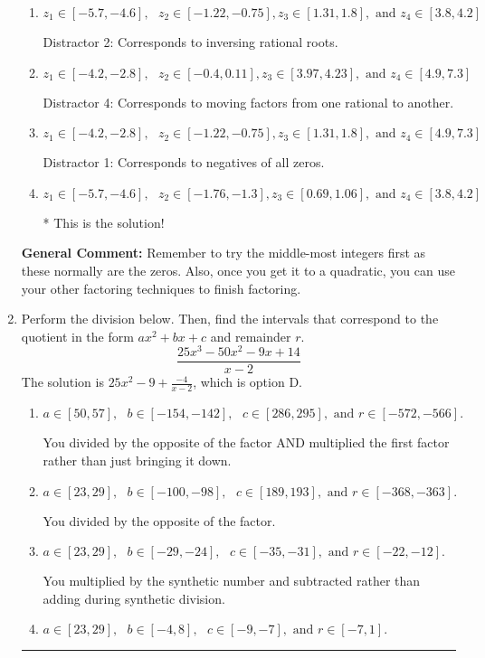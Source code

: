 \documentclass{extbook}[14pt]
\newcommand{\litem}[1]{\item #1

\rule{\textwidth}{0.4pt}}
\begin{document}
\begin{enumerate}
{\begin{enumerate}[label=\Alph*.]
 Distractor 3: Corresponds to negatives of all zeros AND inversing rational roots.
\item \( z_1 \in [-5.7, -4.6], \text{   }  z_2 \in [-1.22, -0.75], z_3 \in [1.31, 1.8], \text{   and   } z_4 \in [3.8, 4.2] \)

 Distractor 2: Corresponds to inversing rational roots.
\item \( z_1 \in [-4.2, -2.8], \text{   }  z_2 \in [-0.4, 0.11], z_3 \in [3.97, 4.23], \text{   and   } z_4 \in [4.9, 7.3] \)

 Distractor 4: Corresponds to moving factors from one rational to another.
\item \( z_1 \in [-4.2, -2.8], \text{   }  z_2 \in [-1.22, -0.75], z_3 \in [1.31, 1.8], \text{   and   } z_4 \in [4.9, 7.3] \)

 Distractor 1: Corresponds to negatives of all zeros.
\item \( z_1 \in [-5.7, -4.6], \text{   }  z_2 \in [-1.76, -1.3], z_3 \in [0.69, 1.06], \text{   and   } z_4 \in [3.8, 4.2] \)

* This is the solution!
\end{enumerate}

\textbf{General Comment:} Remember to try the middle-most integers first as these normally are the zeros. Also, once you get it to a quadratic, you can use your other factoring techniques to finish factoring.
}
\litem{
Perform the division below. Then, find the intervals that correspond to the quotient in the form $ax^2+bx+c$ and remainder $r$.
\[ \frac{25x^{3} -50 x^{2} -9 x + 14}{x -2} \]The solution is \( 25x^{2} -9 + \frac{-4}{x -2} \), which is option D.\begin{enumerate}[label=\Alph*.]
\item \( a \in [50, 57], \text{   } b \in [-154, -142], \text{   } c \in [286, 295], \text{   and   } r \in [-572, -566]. \)

 You divided by the opposite of the factor AND multiplied the first factor rather than just bringing it down.
\item \( a \in [23, 29], \text{   } b \in [-100, -98], \text{   } c \in [189, 193], \text{   and   } r \in [-368, -363]. \)

 You divided by the opposite of the factor.
\item \( a \in [23, 29], \text{   } b \in [-29, -24], \text{   } c \in [-35, -31], \text{   and   } r \in [-22, -12]. \)

 You multiplied by the synthetic number and subtracted rather than adding during synthetic division.
\item \( a \in [23, 29], \text{   } b \in [-4, 8], \text{   } c \in [-9, -7], \text{   and   } r \in [-7, 1]. \)


\end{enumerate}}
\end{enumerate}
\end{document}
